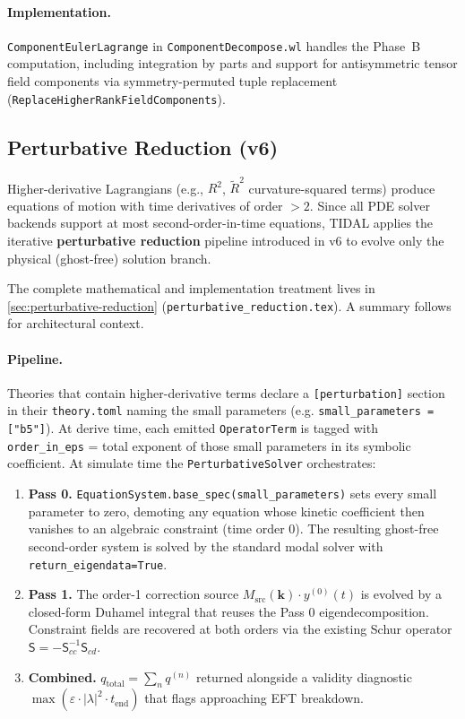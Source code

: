 \paragraph{Implementation.}
\texttt{ComponentEulerLagrange} in \texttt{ComponentDecompose.wl} handles the Phase~B computation, including integration by parts and support for antisymmetric tensor field components via symmetry-permuted tuple replacement (\texttt{ReplaceHigherRankFieldComponents}).

\subsection{Perturbative Reduction (v6)}
\label{sec:ostrogradsky}

Higher-derivative Lagrangians (e.g., $R^2$, $\tilde{R}^2$ curvature-squared terms) produce equations of motion with time derivatives of order $>2$. Since all PDE solver backends support at most second-order-in-time equations, TIDAL applies the iterative \textbf{perturbative reduction} pipeline introduced in v6 to evolve only the physical (ghost-free) solution branch.

The complete mathematical and implementation treatment lives in \cref{sec:perturbative-reduction} (\texttt{perturbative\_reduction.tex}). A summary follows for architectural context.

\paragraph{Pipeline.} Theories that contain higher-derivative terms declare a \verb|[perturbation]| section in their \verb|theory.toml| naming the small parameters (e.g. \verb|small_parameters = ["b5"]|). At derive time, each emitted \verb|OperatorTerm| is tagged with \verb|order_in_eps| = total exponent of those small parameters in its symbolic coefficient. At simulate time the \verb|PerturbativeSolver| orchestrates:
\begin{enumerate}
  \item \textbf{Pass 0.} \verb|EquationSystem.base_spec(small_parameters)| sets every small parameter to zero, demoting any equation whose kinetic coefficient then vanishes to an algebraic constraint (time order 0). The resulting ghost-free second-order system is solved by the standard modal solver with \verb|return_eigendata=True|.
  \item \textbf{Pass 1.} The order-1 correction source $M_{\mathrm{src}}(\mathbf{k}) \cdot y^{(0)}(t)$ is evolved by a closed-form Duhamel integral that reuses the Pass 0 eigendecomposition. Constraint fields are recovered at both orders via the existing Schur operator $\mathsf{S} = -\mathsf{S}_{cc}^{-1} \mathsf{S}_{cd}$.
  \item \textbf{Combined.} $q_{\mathrm{total}} = \sum_n q^{(n)}$ returned alongside a validity diagnostic $\max(\varepsilon \cdot |\lambda|^2 \cdot t_{\mathrm{end}})$ that flags approaching EFT breakdown.
\end{enumerate}

